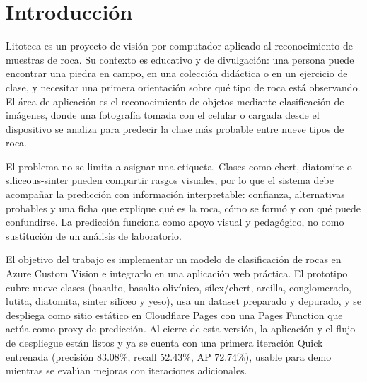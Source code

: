 \chapter{Introducción}
\label{ch:intro}

Litoteca es un proyecto de visión por computador aplicado al reconocimiento de
muestras de roca. Su contexto es educativo y de divulgación: una persona puede
encontrar una piedra en campo, en una colección didáctica o en un ejercicio de
clase, y necesitar una primera orientación sobre qué tipo de roca está observando.
El área de aplicación es el reconocimiento de objetos mediante clasificación de
imágenes, donde una fotografía tomada con el celular o cargada desde el
dispositivo se analiza para predecir la clase más probable entre nueve tipos de
roca.

El problema no se limita a asignar una etiqueta. Clases como chert, diatomite o
siliceous-sinter pueden compartir rasgos visuales, por lo que el sistema debe
acompañar la predicción con información interpretable: confianza, alternativas
probables y una ficha que explique qué es la roca, cómo se formó y con qué puede
confundirse. La predicción funciona como apoyo visual y pedagógico, no como
sustitución de un análisis de laboratorio.

El objetivo del trabajo es implementar un modelo de clasificación de rocas en
Azure Custom Vision e integrarlo en una aplicación web práctica. El prototipo
cubre nueve clases (basalto, basalto olivínico, sílex/chert, arcilla,
conglomerado, lutita, diatomita, sinter silíceo y yeso), usa un dataset preparado
y depurado, y se despliega como sitio estático en Cloudflare Pages con una Pages
Function que actúa como proxy de predicción. Al cierre de esta versión, la
aplicación y el flujo de despliegue están listos y ya se cuenta con una primera
iteración Quick entrenada (precisión 83.08\%, recall 52.43\%, AP 72.74\%), usable
para demo mientras se evalúan mejoras con iteraciones adicionales.
